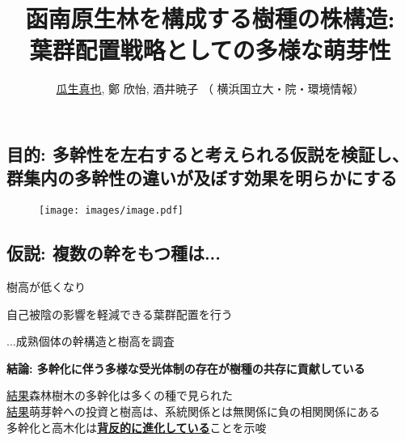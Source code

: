 \documentclass[a0, 36pt, plainboxedsections]{sciposter} %
\title{\textcolor{Blue1}{函南原生林を構成する樹種の株構造:\\葉群配置戦略としての多様な萌芽性}}
\author{\faGroup \hspace{0.02em} \underline{瓜生真也}, 鄭 欣怡, 酒井暁子 （\faUniv \hspace{0.02em} 横浜国立大・院・環境情報） \normalsize{\faEnvelope \hspace{0.02em} \fontspec{ComicSansMS}{suika1127@gmail.com}}}
\begin{document}
\maketitle
\vspace{-2em}
\begin{multicols}{2}
\begin{mdframed}[style=section.frame]
  \centering\huge\textbf{}
\end{mdframed}

\subsection*{目的: 多幹性を左右すると考えられる仮説を検証し、群集内の多幹性の違いが及ぼす効果を明らかにする} %

\begin{figure}
  \center\texttt{[image: images/image.pdf]}  
\end{figure}

\subsection*{仮説: 複数の幹をもつ種は...}

\begin{list}{}{\setlength{\itemindent}{1em}} %
 \item 樹高が低くなり
 \item 自己被陰の影響を軽減できる葉群配置を行う
\end{list}

...成熟個体の幹構造と樹高を調査

\columnbreak
\begin{mdframed}[style=conclusion.frame]
  \Large\textbf{\faFlagAlt \vspace{0.02em} 結論: {多幹化に伴う多様な受光体制の存在が樹種の共存に貢献している}} %
  \vspace{0.4em}
  \flushleft\normalsize{
  \underline{結果}森林樹木の多幹化は多くの種で見られた\\
  \underline{結果}萌芽幹への投資と樹高は、系統関係とは無関係に負の相関関係にある\\
  \faHandLeft \vspace{0.02em} 多幹化と高木化は\underline{\textbf{背反的に進化している}}ことを示唆
  
}
\end{mdframed}
\end{multicols}
\end{document}
